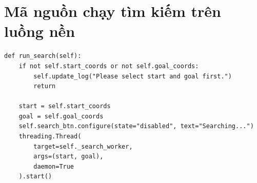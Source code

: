 \documentclass[12pt,a4paper]{article}
\begin{document}
\section{Mã nguồn chạy tìm kiếm trên luồng nền}

\begin{lstlisting}[style=pythonstyle, caption={Tách tác vụ tìm đường khỏi main thread}]
def run_search(self):
    if not self.start_coords or not self.goal_coords:
        self.update_log("Please select start and goal first.")
        return

    start = self.start_coords
    goal = self.goal_coords
    self.search_btn.configure(state="disabled", text="Searching...")
    threading.Thread(
        target=self._search_worker,
        args=(start, goal),
        daemon=True
    ).start()
\end{lstlisting}
\end{document}
